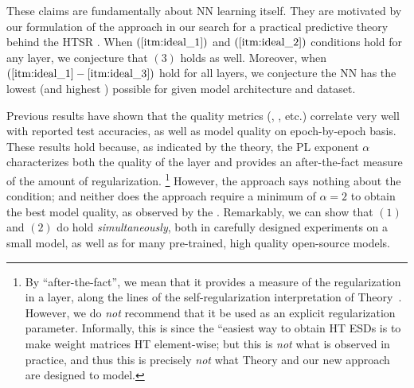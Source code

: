 These claims are fundamentally about NN learning itself. 
They are motivated by our formulation of the \SETOL approach in our search for a practical predictive theory behind the HTSR \Phenomenology.
When $(\ref{itm:ideal_1})$ and $(\ref{itm:ideal_2})$ conditions hold for any layer, we conjecture that $(3)$ holds as well.
Moreover, when $(\ref{itm:ideal_1}-\ref{itm:ideal_3})$ hold for all layers, we conjecture the
NN has the lowest \GeneralizationError (and highest \ModelQuality) possible for given model architecture and dataset.

Previous results have shown that the \HTSR quality metrics (\ALPHA,  \ALPHAHAT, etc.)  correlate very well with reported test accuracies,
as well as model quality on epoch-by-epoch basis.
These results hold because, as indicated by the \HTSR theory, the PL exponent $\alpha$ characterizes both the quality of the layer and provides an after-the-fact measure of the amount of regularization.%
\footnote{By ``after-the-fact'', we mean that it provides a measure of the regularization in a layer, along the lines of the self-regularization interpretation of \HTSR Theory~\cite{MM18_TR_JMLRversion}. However, we do \emph{not} recommend that it be used as an explicit regularization parameter. Informally, this is since the ``easiest way to obtain HT ESDs is to make weight matrices HT element-wise; but this is \emph{not} what is observed in practice, and thus this is precisely \emph{not} what \HTSR Theory and our new \SETOL approach are designed to model.}
However, the \HTSR approach says nothing about the \SETOL \TRACELOG condition; and neither does the \SETOL approach require a minimum of $\alpha=2$ to obtain the best model quality, as observed by the \HTSR \Phenomenology.
Remarkably, we can show that $(1)$ and $(2)$ do hold \emph{simultaneously}, both in carefully designed experiments on a small model,
as well as for many pre-trained, high quality open-source models. 




